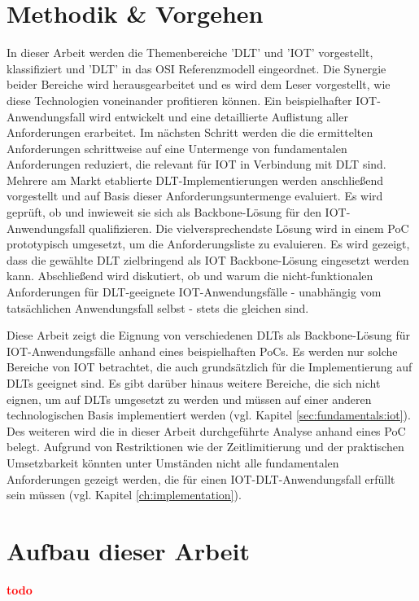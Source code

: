 \section{Methodik \& Vorgehen}
\label{sec:intro:methodology}
In dieser Arbeit werden die Themenbereiche '\ac{DLT}' und '\ac{IOT}' vorgestellt, klassifiziert und '\ac{DLT}' in das \ac{OSI} Referenzmodell eingeordnet. Die Synergie beider Bereiche wird herausgearbeitet und es wird dem Leser vorgestellt, wie diese Technologien voneinander profitieren können. Ein beispielhafter \ac{IOT}-Anwendungsfall wird entwickelt und eine detaillierte Auflistung aller Anforderungen erarbeitet. Im nächsten Schritt werden die die ermittelten Anforderungen schrittweise auf eine Untermenge von fundamentalen Anforderungen reduziert, die relevant für \ac{IOT} in Verbindung mit \ac{DLT} sind. Mehrere am Markt etablierte \ac{DLT}-Implementierungen werden anschließend vorgestellt und auf Basis dieser Anforderungsuntermenge evaluiert. Es wird geprüft, ob und inwieweit sie sich als Backbone-Lösung für den \ac{IOT}-Anwendungsfall qualifizieren. Die vielversprechendste Lösung wird in einem \ac{PoC} prototypisch umgesetzt, um die Anforderungsliste zu evaluieren. Es wird gezeigt, dass die gewählte \ac{DLT} zielbringend als \ac{IOT} Backbone-Lösung eingesetzt werden kann. Abschließend wird diskutiert, ob und warum die nicht-funktionalen Anforderungen für \ac{DLT}-geeignete \ac{IOT}-Anwendungsfälle - unabhängig vom tatsächlichen Anwendungsfall selbst - stets die gleichen sind.

Diese Arbeit zeigt die Eignung von verschiedenen \ac{DLT}s als Backbone-Lösung für \ac{IOT}-Anwendungsfälle anhand eines beispielhaften \ac{PoC}s. Es werden nur solche Bereiche von \ac{IOT} betrachtet, die auch grundsätzlich für die Implementierung auf \ac{DLT}s geeignet sind. Es gibt darüber hinaus weitere Bereiche, die sich nicht eignen, um auf \ac{DLT}s umgesetzt zu werden und müssen auf einer anderen technologischen Basis implementiert werden (vgl. Kapitel \ref{sec:fundamentals:iot}). Des weiteren wird die in dieser Arbeit durchgeführte Analyse anhand eines \ac{PoC} belegt. Aufgrund von Restriktionen wie der Zeitlimitierung und der praktischen Umsetzbarkeit könnten unter Umständen nicht alle fundamentalen Anforderungen gezeigt werden, die für einen \ac{IOT}-\ac{DLT}-Anwendungsfall erfüllt sein müssen (vgl. Kapitel \ref{ch:implementation}).


%
%
\section{Aufbau dieser Arbeit}
\label{sec:intro:structure}
\textbf{\textcolor{red}{todo}}
